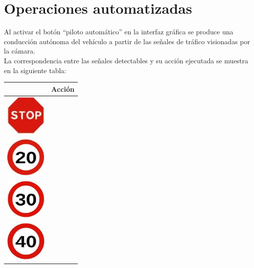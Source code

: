\section{Operaciones automatizadas}
\label{sec:operaciones-automatizadas}

Al activar el botón ``piloto automático'' en la interfaz gráfica se produce una conducción autónoma del vehículo a partir de las señales de tráfico visionadas por la cámara.\\

La correspondencia entre las señales detectables y su acción ejecutada se muestra en la siguiente tabla:\\

\clearpage

\begin{table}[H]
  \begin{center}
    \begin{tabular}{|p{2cm}|p{8cm}|}
      \hline
      \centering{Señal} & \qquad \quad Acción \\
      \hline \includegraphics[width=2cm]{../imagenes/1.jpg} & \vspace*{-.8in}{Orden automática de parada.} \\
      \hline \includegraphics[width=2cm]{../imagenes/2.jpg} & \vspace*{-.8in}{Velocidad fijada a 20*.} \\
      \hline \includegraphics[width=2cm]{../imagenes/3.jpg} & \vspace*{-.8in}{Velocidad fijada a 30*.} \\
      \hline \includegraphics[width=2cm]{../imagenes/4.jpg} & \vspace*{-.8in}{Velocidad fijada a 40*.} \\

\end{tabular}
\end{center}
\end{table}
